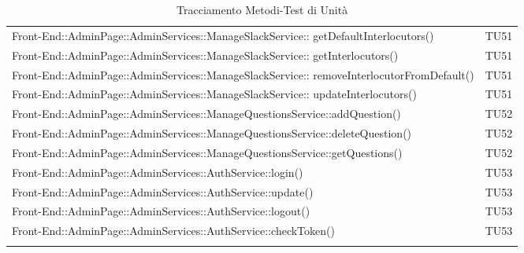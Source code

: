 \documentclass[../PianoDiQualifica_v4.0.0.tex]{subfiles}
\begin{document}
\begin{longtable}[c] {>{\centering\arraybackslash}p{} >{\centering\arraybackslash}p{}}
 			\addlinespace[0.3em]
			\midrule
			\addlinespace[0.3em]
			Front-End::AdminPage::AdminServices::ManageSlackService:: getDefaultInterlocutors() & TU51 \\
			\addlinespace[0.3em]
			\midrule
			\addlinespace[0.3em]
			Front-End::AdminPage::AdminServices::ManageSlackService:: getInterlocutors() & TU51 \\
			\addlinespace[0.3em]
			\midrule
			\addlinespace[0.3em]
			Front-End::AdminPage::AdminServices::ManageSlackService:: removeInterlocutorFromDefault() & TU51 \\
			\addlinespace[0.3em]
			\midrule
			\addlinespace[0.3em]
			Front-End::AdminPage::AdminServices::ManageSlackService:: updateInterlocutors() & TU51 \\
			\addlinespace[0.3em]
			\midrule
			\addlinespace[0.3em]
			Front-End::AdminPage::AdminServices::ManageQuestionsService::addQuestion() & TU52 \\
			\addlinespace[0.3em]
			\midrule
			\addlinespace[0.3em]
			Front-End::AdminPage::AdminServices::ManageQuestionsService::deleteQuestion() & TU52 \\
			\addlinespace[0.3em]
			\midrule
			\addlinespace[0.3em]
			Front-End::AdminPage::AdminServices::ManageQuestionsService::getQuestions() & TU52 \\
			\addlinespace[0.3em]
			\midrule
			\addlinespace[0.3em]
			Front-End::AdminPage::AdminServices::AuthService::login() & TU53 \\
			\addlinespace[0.3em]
			\midrule
			\addlinespace[0.3em]
			Front-End::AdminPage::AdminServices::AuthService::update() & TU53 \\
			\addlinespace[0.3em]
			\midrule
			\addlinespace[0.3em]
 			Front-End::AdminPage::AdminServices::AuthService::logout() & TU53 \\
 			\addlinespace[0.3em]
			\midrule
			\addlinespace[0.3em]
 			Front-End::AdminPage::AdminServices::AuthService::checkToken() & TU53 \\
 			\bottomrule
			\caption{Tracciamento Metodi-Test di Unità}
	\end{longtable}

	\newpage
\end{document}
